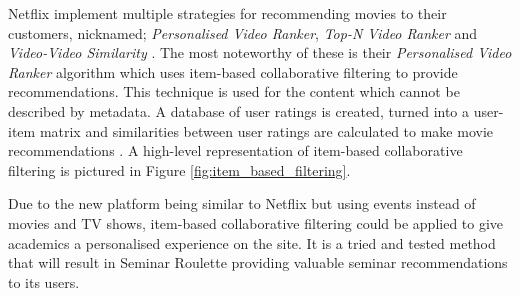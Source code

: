 \documentclass{l4proj}
\begin{document}
Netflix implement multiple strategies for recommending movies to their customers, nicknamed; \emph{Personalised Video Ranker}, \emph{Top-N Video Ranker} and \emph{Video-Video Similarity} \citep{10.1145/2843948}. The most noteworthy of these is their \emph{Personalised Video Ranker}  algorithm which uses item-based collaborative filtering to provide recommendations. This technique is used for the content which cannot be described by metadata. A database of user ratings is created, turned into a user-item matrix and similarities between user ratings are calculated to make movie recommendations \citep{ISINKAYE2015261}. A high-level representation of item-based collaborative filtering is pictured in Figure \ref{fig:item_based_filtering}.

Due to the new platform being similar to Netflix but using events instead of movies and TV shows, item-based collaborative filtering could be applied to give academics a personalised experience on the site. It is a tried and tested method that will result in Seminar Roulette providing valuable seminar recommendations to its users. 
\end{document}
